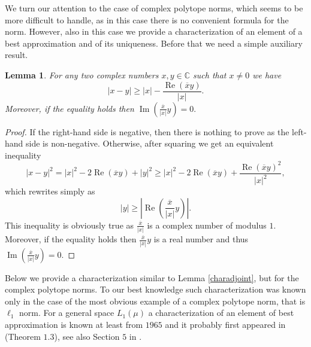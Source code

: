 \documentclass[12pt, reqno]{amsart}
\newtheorem{lem}[twr]{Lemma}
\theoremstyle{definition}
\theoremstyle{remark}
\numberwithin{equation}{section}
\DeclareMathOperator{\re}{Re}
\DeclareMathOperator{\im}{Im}
\begin{document}
We turn our attention to the case of complex polytope norms, which seems to be more difficult to handle, as in this case there is no convenient formula for the norm. However, also in this case we provide a characterization of an element of a best approximation and of its uniqueness. Before that we need a simple auxiliary result.

\begin{lem}
\label{ineqcompl}
For any two complex numbers $x, y \in \mathbb{C}$ such that $x \neq 0$ we have
$$|x-y| \geq |x| - \frac{\re(\overline{x}y)}{|x|}.$$
Moreover, if the equality holds then $\im \left ( \frac{\overline{x}}{|x|}y \right ) = 0.$
\end{lem}
\begin{proof}
If the right-hand side is negative, then there is nothing to prove as the left-hand side is non-negative. Otherwise, after squaring we get an equivalent inequality
$$|x-y|^2 = |x|^2 - 2\re(\overline{x}y) + |y|^2 \geq |x|^2 - 2\re(\overline{x}y) + \frac{\re(\overline{x}y)^2}{|x|^2},$$
which rewrites simply as
$$|y| \geq \left | \re\left ( \frac{\overline{x}}{|x|}y \right ) \right |.$$
This inequality is obviously true as $\frac{\overline{x}}{|x|}$ is a complex number of modulus $1$. Moreover, if the equality holds then $\frac{\overline{x}}{|x|}y$ is a real number and thus $\im \left ( \frac{\overline{x}}{|x|}y  \right )=0$.
\end{proof}

Below we provide a characterization similar to Lemma \ref{charadjoint}, but for the complex polytope norms. To our best knowledge such characterization was known only in the case of the most obvious example of a complex polytope norm, that is $\ell_1$ norm. For a general space $L_1(\mu)$ a characterization of an element of best approximation is known at least from $1965$ and it probably first appeared in \cite{kripkerivlin} (Theorem $1.3$), see also Section $5$ in \cite{survey}.
\end{document}
